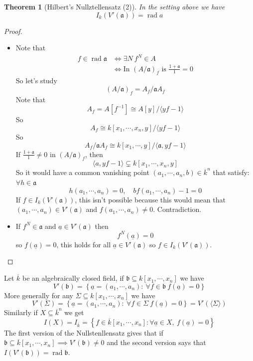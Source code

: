 \documentclass[11pt,a4paper]{article}
\theoremstyle{definition}
\theoremstyle{plain}
\newtheorem{theorem}[definition]{Theorem}
\theoremstyle{remark}
\renewcommand{\set}[1]{\left\{ #1 \right\}}
\newcommand{\angles}[1]{\langle #1 \rangle}
\newcommand{\rad}{\operatorname{rad}}
\begin{document}
\begin{theorem}[Hilbert's Nullztellensatz (2)]
    In the setting above we have 
    $$I_k(V'(\mathfrak{a})) = \rad a$$    
\end{theorem}

\begin{proof}
    \begin{itemize}
        \item[$\subseteq$] Note that
        \begin{align*}
            f \in \rad \mathfrak{a} &\iff \exists N \ f^N \in A \\
            &\iff \text{In } (A/\mathfrak{a})_f \text{ is } \frac{1 + \mathfrak{a}}{1} = 0
        \end{align*}
        So let's study 
        $$(A/\mathfrak{a})_f = A_f / \mathfrak{a}A_f$$
        Note that 
        $$A_f = A[f^{-1}] \cong A[y]/\angles{yf - 1}$$
        So 
        $$A_f \cong k[x_1, \cdots, x_n, y] / \angles{yf - 1}$$
        So 
        $$A_f / \mathfrak{a} A_f \cong k[x_1, \cdots, y]/\angles{\mathfrak{a}, yf-1}$$
        If  $\frac{1 + \mathfrak{a}}{1} \ne 0$ in $(A/\mathfrak{a})_f$, then 
        $$\angles{a, yf-1} \subsetneq k[x_1, \cdots, x_n, y]$$
        So it would have a common vanishing point $(a_1, \cdots, a_n, b) \in \overline{k}^n$ that satisfy: $\forall h \in \mathfrak{a}$
        $$h(a_1, \cdots, a_n) = 0, \quad b f(a_1, \cdots, a_n) - 1= 0$$
        If $f \in I_k(V'(\mathfrak{a}))$, this isn't possible because this would mean that $(a_1, \cdots, a_n) \in V'(\mathfrak{a})$ and 
        $f(a_1, \cdots, a_n) \ne 0$. Contradiction.

        \item[$\supseteq$] If $f^N \in \mathfrak{a}$ and $\underline{a} \in V'(\mathfrak{a})$ then 
        $$f^N (\underline{a}) = 0$$
        so $f(\underline{a}) = 0$, this holds for all $\underline{a} \in V'(\mathfrak{a})$ so 
        $f \in I_k(V'(\mathfrak{a}))$.
    \end{itemize}
\end{proof}

Let $\overline{k}$ be an algebraically closed field, if $\mathfrak{b} \subseteq k[x_1, \cdots, x_n]$ we have 
$$V'(\mathfrak{b}) = \set{\underline{a} = (a_1, \cdots, a_n) \colon \ \forall f \in \mathfrak{b} \ f(\underline{a}) = 0}$$
More generally for any $\Sigma \subseteq k[x_1, \cdots, x_n]$ we have 
$$V'(\Sigma) = \set{\underline{a} = (a_1, \cdots, a_n) \colon \ \forall f \in \Sigma \ f(\underline{a}) = 0} = V'(\mathfrak{\angles{\Sigma}})$$
Similarly if $X \subseteq \overline{k}^n$ we get 
$$I(X) = I_{\overline{k}} = \set{f \in \overline{k}[x_1, \cdots, x_n] \colon \forall \underline{a} \in X, \ f(\underline{a}) = 0}$$
The first version of the Nullstenllensatz gives that if $\mathfrak{b} \subseteq \overline{k} [x_1, \cdots, x_n] \implies V'(\mathfrak{b}) \ne 0$
and the second version says that $I(V'(\mathfrak{b})) = \rad \mathfrak{b}$. 
\end{document}
